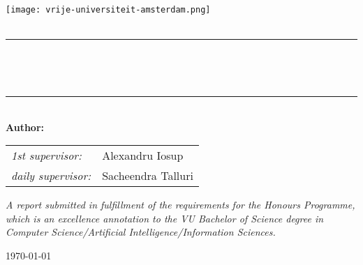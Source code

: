 \begin{titlepage}
    \newcommand{\HRule}{\rule{0.8\linewidth}{0.2mm}}

    \centering

    \vspace*{6em}

    \textsc{\large \theinstitution}\\[1em]

    \texttt{[image: vrije-universiteit-amsterdam.png]}\\
    \vspace{4em}
    \textsc{\Large \thesubject}\\
    \vspace{4em}

    \HRule\\[0.7cm]

    \begin{minipage}{0.75\textwidth}
      \centering
      {\LARGE\bfseries \thetitle}\\[0.4cm]
      \vspace{1em}
    \end{minipage}

    \HRule\\[1.5cm]

    {\Large \textbf{Author:} \theauthor}\\
    \vspace{2em}
    \begin{minipage}{0.7\textwidth}
      \large
      \centering
      \begin{tabular}{ l l }
        \textit{1st supervisor:}      & Alexandru Iosup\\
        \textit{daily supervisor:}    & Sacheendra Talluri\\
      \end{tabular}
    \end{minipage}

    \vfill
    \begin{minipage}{0.8\textwidth}
      \centering
      \textit{\large
        A report submitted in fulfillment of the requirements for the Honours Programme, which is an excellence annotation to the VU Bachelor of Science
        degree in Computer Science/Artificial Intelligence/Information Sciences.
      }
    \end{minipage}

    \vspace{2em}
    {\large\today}

    \vspace{4em}
\end{titlepage}

